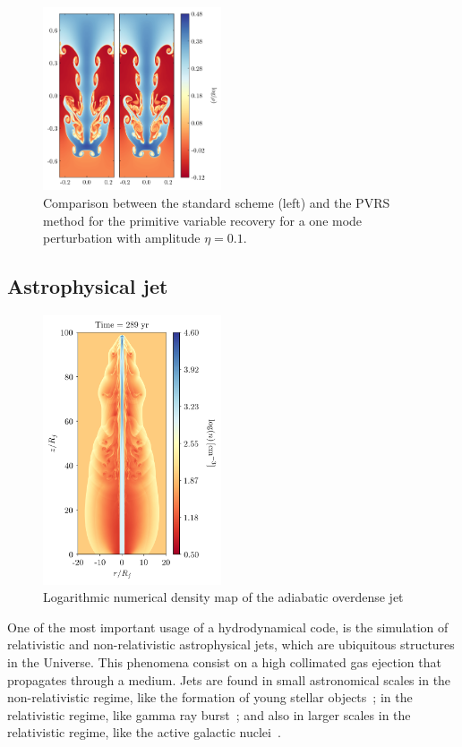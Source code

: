  \begin{figure}
     \centering
     \includegraphics[width=0.47\textwidth]{Figures/rt-pvrs.png}
     \caption{Comparison between the standard scheme (left) and the PVRS method for the primitive variable recovery for a one mode perturbation with amplitude $\eta = 0.1$.}
     \label{fig:rt-2}
 \end{figure}
 
\subsection{Astrophysical jet}
\label{subsec:astrojet}

\begin{figure}
    \centering
    \includegraphics[width=0.47\textwidth]{Figures/jet.png}
    \caption{Logarithmic numerical density map of the adiabatic overdense jet}
    \label{fig:jet}
\end{figure}

One of the most important usage of a hydrodynamical code, is the simulation of relativistic and non-relativistic astrophysical jets, which are ubiquitous structures in the Universe. This phenomena consist on a high collimated gas ejection that propagates through a medium. Jets are found in small astronomical scales in the non-relativistic regime, like the formation of young stellar objects~\citep[eg.][]{raga2013}; in the relativistic regime, like gamma ray burst~\citep[eg.][]{granot2018}; and also in larger scales in the relativistic regime, like the active galactic nuclei~\citep[eg.][]{blandford2018}.

